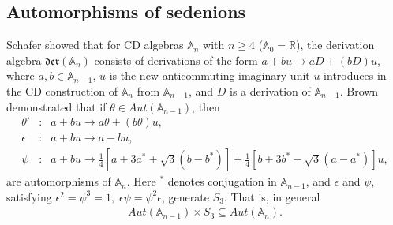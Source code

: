 \documentclass{article}
\newcommand{\bb}[1]{\mathbb{#1}}
\begin{document}
\subsection{Automorphisms of sedenions}

Schafer \cite{schafer1954algebras} showed that for CD algebras $\bb{A}_n$ with $n\geq 4$ ($\bb{A}_0=\bb{R}$), the derivation algebra $\mathfrak{der}(\bb{A}_n)$  consists of derivations of the form $a+bu\rightarrow aD+(bD)u$, where $a,b\in\bb{A}_{n-1}$, $u$ is the new anticommuting imaginary unit $u$ introduces in the CD construction of $\bb{A}_n$ from $\bb{A}_{n-1}$, and $D$ is a derivation of $\bb{A}_{n-1}$. Brown \cite{brown1967generalized} demonstrated that if $\theta\in Aut(\bb{A}_{n-1})$, then 
\begin{eqnarray}
\theta'&:& a+bu\rightarrow a\theta+(b\theta)u,\\
\epsilon&:& a+bu\rightarrow a-bu,\\
\psi&:& a+bu\rightarrow \frac{1}{4}[a+3a^*+\sqrt{3}(b-b^*)]+\frac{1}{4}[b+3b^*-\sqrt{3}(a-a^*)]u,
\end{eqnarray}
are automorphisms of $\bb{A}_n$. Here ${}^*$ denotes conjugation in $\bb{A}_{n-1}$,  and $\epsilon$ and $\psi$, satisfying $\epsilon^2=\psi^3=1,\;\epsilon\psi=\psi^2\epsilon$, generate $S_3$. That is, in general
\begin{eqnarray}
Aut(\bb{A}_{n-1})\times S_3\subseteq Aut(\bb{A}_n).
\end{eqnarray}
\end{document}
